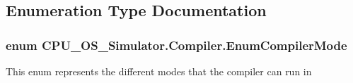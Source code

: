 \subsection{Enumeration Type Documentation}
\hypertarget{namespace_c_p_u___o_s___simulator_1_1_compiler_ada8d93b571fa15a0f2eac8c9647a89fe}{}
\subsubsection[{Enum\+Compiler\+Mode}]{\setlength{\rightskip}{0pt plus 5cm}enum {\bf C\+P\+U\+\_\+\+O\+S\+\_\+\+Simulator.\+Compiler.\+Enum\+Compiler\+Mode}\hspace{0.3cm}{\ttfamily [strong]}}\label{namespace_c_p_u___o_s___simulator_1_1_compiler_ada8d93b571fa15a0f2eac8c9647a89fe}


This enum represents the different modes that the compiler can run in 

